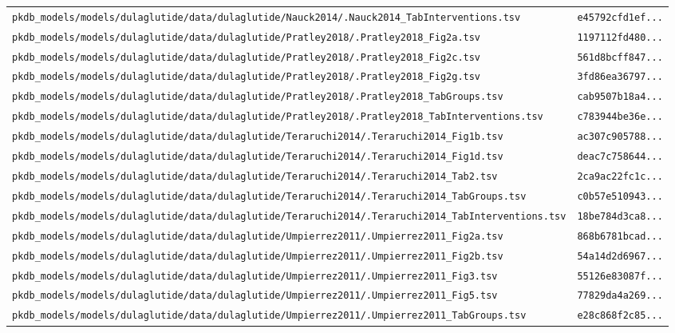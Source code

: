 \documentclass{article}
\begin{document}
\begin{longtable}{ll}
\texttt{pkdb\_models/models/dulaglutide/data/dulaglutide/Nauck2014/.Nauck2014\_TabInterventions.tsv} & \texttt{e45792cfd1ef...} \\
\texttt{pkdb\_models/models/dulaglutide/data/dulaglutide/Pratley2018/.Pratley2018\_Fig2a.tsv} & \texttt{1197112fd480...} \\
\texttt{pkdb\_models/models/dulaglutide/data/dulaglutide/Pratley2018/.Pratley2018\_Fig2c.tsv} & \texttt{561d8bcff847...} \\
\texttt{pkdb\_models/models/dulaglutide/data/dulaglutide/Pratley2018/.Pratley2018\_Fig2g.tsv} & \texttt{3fd86ea36797...} \\
\texttt{pkdb\_models/models/dulaglutide/data/dulaglutide/Pratley2018/.Pratley2018\_TabGroups.tsv} & \texttt{cab9507b18a4...} \\
\texttt{pkdb\_models/models/dulaglutide/data/dulaglutide/Pratley2018/.Pratley2018\_TabInterventions.tsv} & \texttt{c783944be36e...} \\
\texttt{pkdb\_models/models/dulaglutide/data/dulaglutide/Teraruchi2014/.Teraruchi2014\_Fig1b.tsv} & \texttt{ac307c905788...} \\
\texttt{pkdb\_models/models/dulaglutide/data/dulaglutide/Teraruchi2014/.Teraruchi2014\_Fig1d.tsv} & \texttt{deac7c758644...} \\
\texttt{pkdb\_models/models/dulaglutide/data/dulaglutide/Teraruchi2014/.Teraruchi2014\_Tab2.tsv} & \texttt{2ca9ac22fc1c...} \\
\texttt{pkdb\_models/models/dulaglutide/data/dulaglutide/Teraruchi2014/.Teraruchi2014\_TabGroups.tsv} & \texttt{c0b57e510943...} \\
\texttt{pkdb\_models/models/dulaglutide/data/dulaglutide/Teraruchi2014/.Teraruchi2014\_TabInterventions.tsv} & \texttt{18be784d3ca8...} \\
\texttt{pkdb\_models/models/dulaglutide/data/dulaglutide/Umpierrez2011/.Umpierrez2011\_Fig2a.tsv} & \texttt{868b6781bcad...} \\
\texttt{pkdb\_models/models/dulaglutide/data/dulaglutide/Umpierrez2011/.Umpierrez2011\_Fig2b.tsv} & \texttt{54a14d2d6967...} \\
\texttt{pkdb\_models/models/dulaglutide/data/dulaglutide/Umpierrez2011/.Umpierrez2011\_Fig3.tsv} & \texttt{55126e83087f...} \\
\texttt{pkdb\_models/models/dulaglutide/data/dulaglutide/Umpierrez2011/.Umpierrez2011\_Fig5.tsv} & \texttt{77829da4a269...} \\
\texttt{pkdb\_models/models/dulaglutide/data/dulaglutide/Umpierrez2011/.Umpierrez2011\_TabGroups.tsv} & \texttt{e28c868f2c85...} \\

\end{longtable}
\end{document}
